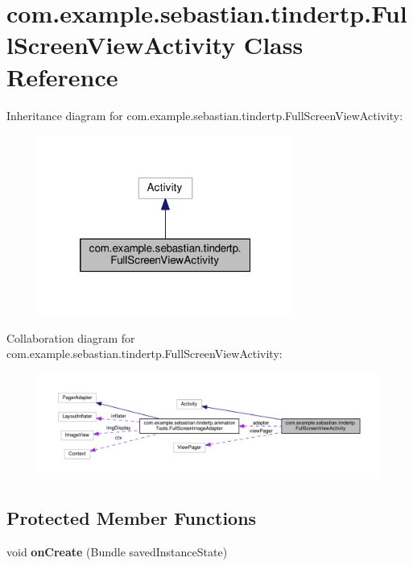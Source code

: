 \hypertarget{classcom_1_1example_1_1sebastian_1_1tindertp_1_1FullScreenViewActivity}{}\section{com.\+example.\+sebastian.\+tindertp.\+Full\+Screen\+View\+Activity Class Reference}
\label{classcom_1_1example_1_1sebastian_1_1tindertp_1_1FullScreenViewActivity}


Inheritance diagram for com.\+example.\+sebastian.\+tindertp.\+Full\+Screen\+View\+Activity\+:\nopagebreak
\begin{figure}[H]
\begin{center}
\leavevmode
\includegraphics[width=236pt]{classcom_1_1example_1_1sebastian_1_1tindertp_1_1FullScreenViewActivity__inherit__graph}
\end{center}
\end{figure}


Collaboration diagram for com.\+example.\+sebastian.\+tindertp.\+Full\+Screen\+View\+Activity\+:\nopagebreak
\begin{figure}[H]
\begin{center}
\leavevmode
\includegraphics[width=350pt]{classcom_1_1example_1_1sebastian_1_1tindertp_1_1FullScreenViewActivity__coll__graph}
\end{center}
\end{figure}
\subsection*{Protected Member Functions}
\begin{DoxyCompactItemize}
\item 
void {\bfseries on\+Create} (Bundle saved\+Instance\+State)\hypertarget{classcom_1_1example_1_1sebastian_1_1tindertp_1_1FullScreenViewActivity_af5c079a6d858da39f42f1cdcff02cf8a}{}\label{classcom_1_1example_1_1sebastian_1_1tindertp_1_1FullScreenViewActivity_af5c079a6d858da39f42f1cdcff02cf8a}

\end{DoxyCompactItemize}
